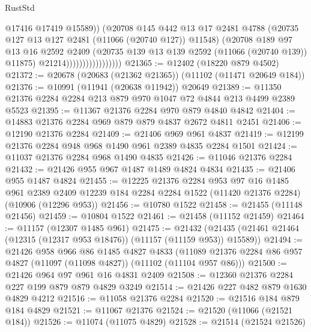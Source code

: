 \begin{lexlean}{RustStd}
\begin{coremodule}
                                      @17416
                                      @17419
                                      @15589))
                                  (@20708
                                    @145
                                    @442
                                    @13
                                    @17
                                    @2481
                                    @4788
                                    (@20735 @127 @13 @127 @2481 (@11066 (@20740 @127)) @11548)
                                    (@20708
                                      @189
                                      @97
                                      @13
                                      @16
                                      @2592
                                      @2409
                                      (@20735 @139 @13 @139 @2592 (@11066 (@20740 @139)) @11875)
                                      @21214)))))))))))))))))
@21365 := @12402 (@18220 @879 @4502)
@21372 := @20678 (@20683 (@21362 @21365)) (@11102 (@11471 @20649 @184))
@21376 := @10991 (@11941 (@20638 @11942)) @20649
@21389 := @11350 @21376 @2284 @2284 @213 @879 @970 @1047 @72 @4844 @213 @4499 @2389 @5523
@21395 := @11367 @21376 @2284 @970 @879 @4840 @4842
@21404 := @14883 @21376 @2284 @969 @879 @879 @4837 @2672 @4811 @2451
@21406 := @12190 @21376 @2284
@21409 := @21406 @969 @961 @4837
@21419 := @12199 @21376 @2284 @948 @968 @1490 @961 @2389 @4835 @2284 @1501
@21424 := @11037 @21376 @2284 @968 @1490 @4835
@21426 := @11046 @21376 @2284
@21432 := @21426 @955 @967 @1487 @1489 @4824 @4834
@21435 := @21406 @955 @1487 @4824
@21455 := @12225
    @21376
    @2284
    @953
    @97
    @16
    @1485
    @961
    @2389
    @2409
    @12239
    @184
    @2284
    @2284
    @1522
    (@11420 @21376 @2284)
    (@10906 (@12296 @953))
@21456 := @10780 @1522
@21458 := @21455 (@11148 @21456)
@21459 := @10804 @1522
@21461 := @21458 (@11152 @21459)
@21464 := @11157 (@12307 @1485 @961)
@21475 := @21432
    (@21435 (@21461 @21464 (@12315 (@12317 @953 @18476)) (@11157 (@11159 @953)) @15589))
@21494 := @21426
    @958
    @966
    @86
    @1485
    @4827
    @4833
    (@11089 @21376 @2284 @86 @957 @4827 (@11097 (@11098 @4827)) (@11102 (@11104 @957 @86)))
@21500 := @21426 @964 @97 @961 @16 @4831 @2409
@21508 := @12360 @21376 @2284 @227 @199 @879 @879 @4829 @3249
@21514 := @21426 @227 @482 @879 @1630 @4829 @4212
@21516 := @11058 @21376 @2284
@21520 := @21516 @184 @879 @184 @4829
@21521 := @11067 @21376
@21524 := @21520 (@11066 (@21521 @184))
@21526 := @11074 (@11075 @4829)
@21528 := @21514 (@21524 @21526)

\end{coremodule}
\end{lexlean}
